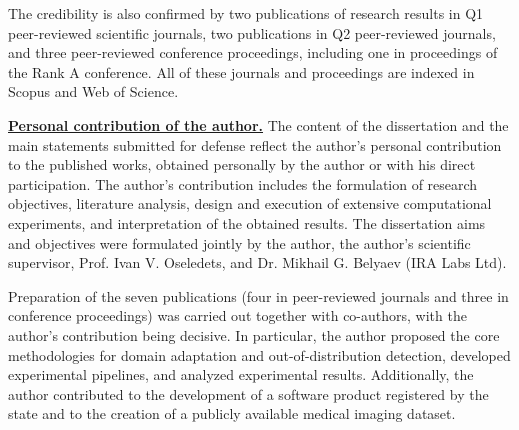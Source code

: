 The credibility is also confirmed by two publications of research results in Q1 peer-reviewed scientific journals, two publications in Q2 peer-reviewed journals, and three peer-reviewed conference proceedings, including one in proceedings of the Rank A conference. All of these journals and proceedings are indexed in Scopus and Web of Science.


\underline{\textbf{Personal contribution of the author.}}
The content of the dissertation and the main statements submitted for defense reflect the author’s personal contribution to the published works, obtained personally by the author or with his direct participation. The author’s contribution includes the formulation of research objectives, literature analysis, design and execution of extensive computational experiments, and interpretation of the obtained results. The dissertation aims and objectives were formulated jointly by the author, the author’s scientific supervisor, Prof. Ivan V. Oseledets, and Dr. Mikhail G. Belyaev (IRA Labs Ltd).

Preparation of the seven publications (four in peer-reviewed journals and three in conference proceedings) was carried out together with co-authors, with the author’s contribution being decisive. In particular, the author proposed the core methodologies for domain adaptation and out-of-distribution detection, developed experimental pipelines, and analyzed experimental results. Additionally, the author contributed to the development of a software product registered by the state and to the creation of a publicly available medical imaging dataset.


